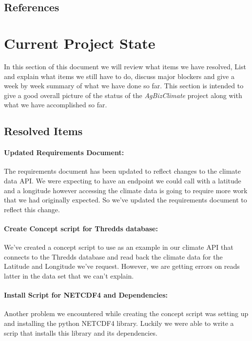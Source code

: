 \documentclass[onecolumn, draftclsnofoot,10pt, compsoc]{article}
\begin{document}
		    
		\renewcommand\refname{\vskip -1cm}
		\subsection{References}

		    \nocite{*}
            
            
            

\section{Current Project State}
    In this section of this document we will review what items we have resolved, List and explain what items we still have to do, discuss major blockers and give a week by week summary of what we have done so far. This section is intended to give a good overall picture of the status of the \textit{AgBizClimate} project along with what we have accomplished so far.\\

	\subsection{Resolved Items}
		\paragraph{Updated Requirements Document:} The requirements document has been updated to reflect changes to the climate data API. We were expecting to have an endpoint we could call with a latitude and a longitude however accessing the climate data is going to require more work that we had originally expected. So we've updated the requirements document to reflect this change.\\
		
		
		\paragraph{Create Concept script for Thredds database:} We've created a concept script to use as an example in our climate API that connects to the Thredds database and read back the climate data for the Latitude and Longitude we've request. However, we are getting errors on reads latter in the data set that we can't explain.\\
		
		
		\paragraph{Install Script for NETCDF4 and Dependencies:} Another problem we encountered while creating the concept script was setting up and installing the python NETCDF4 library. Luckily we were able to write a scrip that installs this library and its dependencies.\\
		
\end{document}
